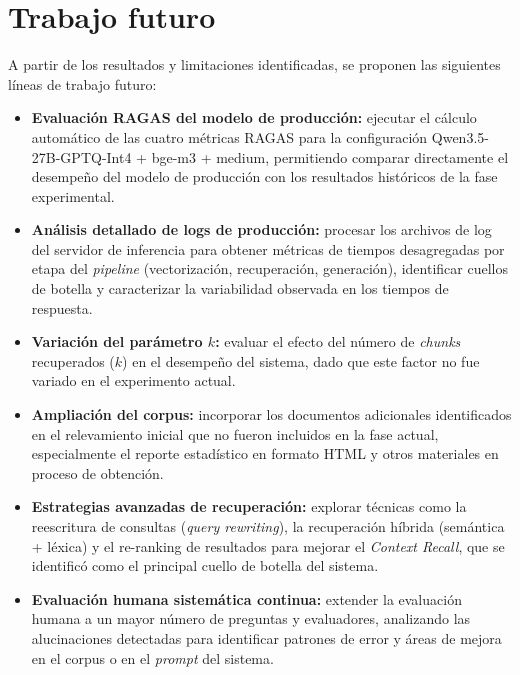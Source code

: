 \section{Trabajo futuro}\label{sec:trabajo_futuro}

A partir de los resultados y limitaciones identificadas, se proponen las siguientes líneas de trabajo futuro:

\begin{itemize}

\item \textbf{Evaluación RAGAS del modelo de producción:} ejecutar el cálculo automático de las cuatro métricas RAGAS para la configuración Qwen3.5-27B-GPTQ-Int4 + bge-m3 + medium, permitiendo comparar directamente el desempeño del modelo de producción con los resultados históricos de la fase experimental.

\item \textbf{Análisis detallado de logs de producción:} procesar los archivos de log del servidor de inferencia para obtener métricas de tiempos desagregadas por etapa del \textit{pipeline} (vectorización, recuperación, generación), identificar cuellos de botella y caracterizar la variabilidad observada en los tiempos de respuesta.

\item \textbf{Variación del parámetro $k$:} evaluar el efecto del número de \textit{chunks} recuperados ($k$) en el desempeño del sistema, dado que este factor no fue variado en el experimento actual.

\item \textbf{Ampliación del corpus:} incorporar los documentos adicionales identificados en el relevamiento inicial que no fueron incluidos en la fase actual, especialmente el reporte estadístico en formato HTML y otros materiales en proceso de obtención.

\item \textbf{Estrategias avanzadas de recuperación:} explorar técnicas como la reescritura de consultas (\textit{query rewriting}), la recuperación híbrida (semántica + léxica) y el re-ranking de resultados para mejorar el \textit{Context Recall}, que se identificó como el principal cuello de botella del sistema.

\item \textbf{Evaluación humana sistemática continua:} extender la evaluación humana a un mayor número de preguntas y evaluadores, analizando las alucinaciones detectadas para identificar patrones de error y áreas de mejora en el corpus o en el \textit{prompt} del sistema.

\end{itemize}

